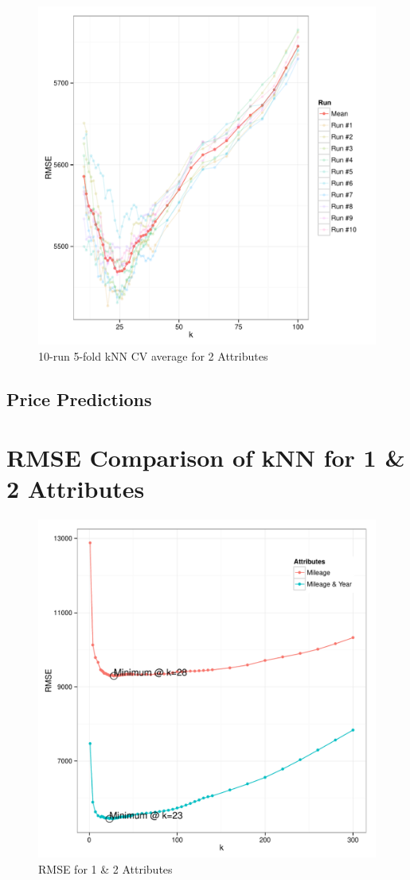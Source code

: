 \documentclass[11pt, fleqn]{article}
\begin{document}
\begin{figure}[!htb]
  \centering
  \includegraphics[scale=.5]{2p_cv_multi_k.pdf}
  \caption{10-run 5-fold kNN CV average for 2 Attributes}
  \label{fig:2p_k_multi}
\end{figure}


\subsection{Price Predictions}


\section{RMSE Comparison of kNN for 1 \& 2 Attributes}
\begin{figure}[!htb]
  \centering
  \includegraphics[scale=.5]{1p_2p_cv_compare.pdf}
  \caption{RMSE for 1 \& 2 Attributes}
  \label{fig:p_compare}
\end{figure}
\end{document}
